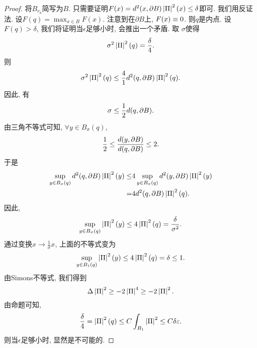 \begin{proof}
    将$B_{r_0}$简写为$B$. 只需要证明$F(x)=d^2(x,\P B)\abs{\II}^2(x) \le \delta$即可. 我们用反证法. 设$F(q)=\max_{x \in B}F(x)$. 注意到在$\partial B$上, $F(x) \eq 0$. 则$q$是内点.  设$F(q) > \delta$, 我们将证明当$\epsilon$足够小时, 会推出一个矛盾. 取 $\sigma$使得
    \begin{equation}
        \sigma^2\abs{\II}^2(q)=\frac{\delta}{4}.
    \end{equation}
    则
    \begin{equation}
        \sigma^2\abs{\II}^2(q) \le \frac{4}{1} d^2(q,\P B)\abs{\II}^2(q).
    \end{equation}
    因此, 有
    \begin{equation}
        \sigma \le \frac{1}{2}d(q,\P B).
    \end{equation}
    由三角不等式可知,  $\forall y \in B_\sigma(q)$,
    \begin{equation}
        \frac{1}{2} \le \frac{d(y,\P B)}{d(q,\P B)} \le 2.
    \end{equation}
    于是
    \begin{equation}
        \begin{split}
            \sup_{y\in B_\sigma(q)} d^2(q,\P B) \abs{\II}^2(y) \le &4\sup_{y\in B_\sigma(q)}d^2(y,\P B)\abs{\II}^2(y) \\
            =& 4d^2(q,\P B) \abs{\II}^2(q).
        \end{split}
    \end{equation}
    因此,
    \begin{equation}
        \sup_{y \in B_\sigma(q)} \abs{\II}^2(y) \le 4\abs{\II}^2(q)=\frac{\delta}{\sigma^2}.
    \end{equation}
    通过变换$x\to \frac{1}{\sigma}x$, 上面的不等式变为
    \begin{equation} \label{ii_sup}
        \sup_{y \in B_1(q)} \abs{\II}^2(y) \le 4\abs{\II}^2(q)=\delta \le 1.
    \end{equation}
    由Simons不等式, 我们得到
    \begin{equation}
        \Delta \abs{\II}^2 \ge -2\abs{\II}^4 \ge -2 \abs{\II}^2.
    \end{equation}
    由命题\label{sub_harmonic}可知,
    \begin{equation}
        \frac{\delta}{4}=\abs{\II}^2(q) \le C \int_{B_1} \abs{\II}^2 \le C\delta\epsilon.
    \end{equation}
    则当$\epsilon$足够小时, 显然是不可能的.
\end{proof}
